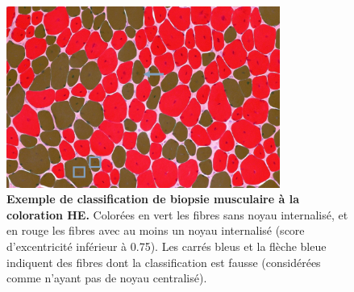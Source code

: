 \begin{figure}[!ht]
 \centering
 \includegraphics[width=0.8\textwidth]{figures/he_paint.png}
 \caption[Exemple de classification de biopsie musculaire à la coloration HE]{\textbf{Exemple de classification de biopsie musculaire à la coloration HE. }Colorées en vert les fibres sans noyau internalisé, et en rouge les fibres avec au moins un noyau internalisé (score d'excentricité inférieur à 0.75). Les carrés bleus et la flèche bleue indiquent des fibres dont la classification est fausse (considérées comme n'ayant pas de noyau centralisé).}
 \label{fig:he_paint}
\end{figure}

